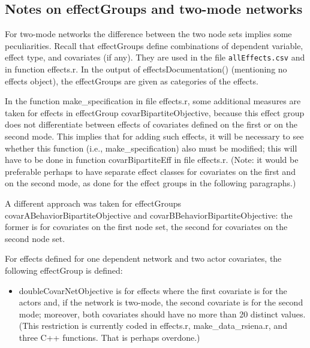 \documentclass[a4paper,fleqn,11pt]{article}
\newcommand{\+}{\, + \,}
\newcommand{\sfn}[1]{\textsf{#1}}
\begin{document}
\subsection{Notes on effectGroups and two-mode networks}
\label{S_notestwomode}

For two-mode networks the difference between the two node sets implies
some peculiarities.
Recall that effectGroups define combinations of dependent variable, 
effect type, and covariates (if any). 
They are used in the file \texttt{allEffects.csv}
and in function \sfn{effects.r}.
In the output of \sfn{effectsDocumentation()} 
(mentioning no effects object), the effectGroups are 
given as categories of the effects.

In the function \textsf{make\_specification} in file \sfn{effects.r}, 
some additional
measures are taken for effects in effectGroup \sfn{covarBipartiteObjective},
because this effect group does not differentiate between effects of covariates
defined on the first or on the second mode.
This implies that for adding such effects, it will be necessary to see whether
this function (i.e., \textsf{make\_specification}) also must be modified;
this will have to be done
in function \sfn{covarBipartiteEff} in file \sfn{effects.r}.
(Note: it would be preferable perhaps to have separate effect classes
for covariates on the first and on the second mode, as done for the effect
groups in the following paragraphs.)

A different approach was taken for effectGroups
\sfn{covarABehaviorBipartiteObjective} and \sfn{covarBBehaviorBipartiteObjective}:
the former is for covariates on the first node set, the second for
covariates on the second node set.

For effects defined for one dependent network and two actor covariates,
the following effectGroup is defined:
\begin{itemize}
\item \sfn{doubleCovarNetObjective} is for effects where the
    first covariate is for the actors and, if the network is two-mode,
    the second covariate is for the second mode;
    moreover, both covariates should have no more than
    20 distinct values. (This restriction is currently
    coded in \sfn{effects.r}, \sfn{make\_data\_rsiena.r},
    and three C++ functions. That is perhaps overdone.)
\end{itemize}
\medskip
\end{document}
